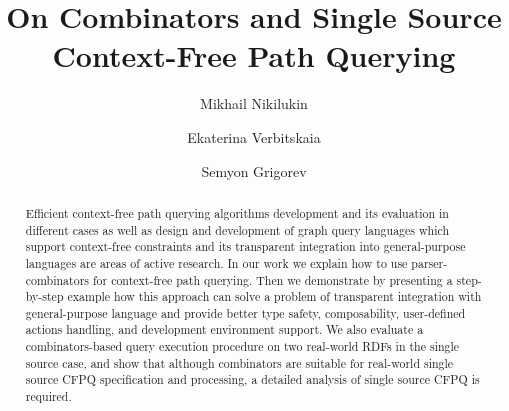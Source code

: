 \documentclass[sigconf,table,anonymous]{acmart}
\begin{document}
\title{On Combinators and Single Source Context-Free Path Querying}

\author{Mikhail Nikilukin}

\author{Ekaterina Verbitskaia}


\author{Semyon Grigorev}


\renewcommand{\shortauthors}{M. Nikolukin, E. Verbitskaia, S. Grigorev}

\begin{abstract}
  Efficient context-free path querying algorithms development and its evaluation in different cases as well as design and development of graph query languages which support context-free constraints and its transparent integration into general-purpose languages are areas of active research.
  In our work we explain how to use parser-combinators for context-free path querying.
  Then we demonstrate by presenting a step-by-step example how this approach can solve a problem of transparent integration with general-purpose language and provide better type safety, composability, user-defined actions handling, and development environment support.
  We also evaluate a combinators-based query execution procedure on two real-world RDFs in the single source case, and show that although combinators are suitable for real-world single source CFPQ specification and processing, a detailed analysis of single source CFPQ is required.
\end{abstract}
\end{document}
